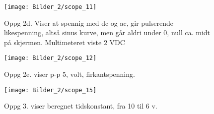 \documentclass[norsk,10pt,a4paper]{article}
\begin{document}
	\begin{figure} [H]
		\centering
		\texttt{[image: Bilder\_2/scope\_11]}
		\caption{Oppg 2d. Viser at spennig med dc og ac, gir pulserende likespenning, 
			altså sinus kurve, men går aldri under 0, null ca. midt på skjermen. Multimeteret viste 2 VDC}
		\label{fig:scope11}
	\end{figure}
	
	\begin{figure} [H]
		\centering
		\texttt{[image: Bilder\_2/scope\_12]}
		\caption{Oppg 2e. viser p-p 5, volt, firkantspenning.}
		\label{fig:scope12}
	\end{figure}
	
	\begin{figure} [H]
		\centering
		\texttt{[image: Bilder\_2/scope\_15]}
		\caption{Oppg 3. viser beregnet tidskonstant, fra 10 til 6 v.}
		\label{fig:scope15}
	\end{figure}
	
	
\end{document}
